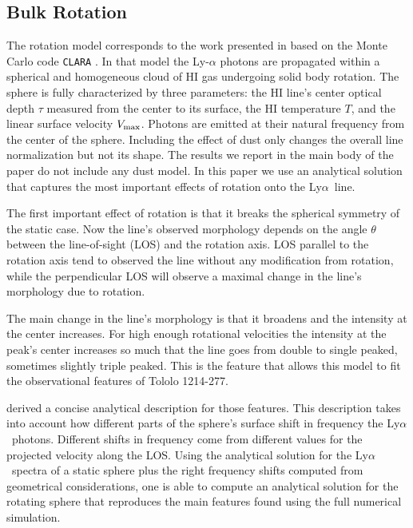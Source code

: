 \documentclass[a4,useAMS,usenatbib,usegraphicx]{mn2e}
\newcommand{\tol}{Tololo 1214-277}
\newcommand{\lya}{Ly$\alpha$}
\begin{document}
\subsection{Bulk Rotation}

The rotation model corresponds to the work presented in
\citep{GaravitoCamargo2014} based on the Monte Carlo code
\texttt{CLARA} \citep{CLARA}. 
In that model the Ly-$\alpha$ photons are propagated 
within a spherical and homogeneous cloud of HI gas undergoing solid
body rotation.
The sphere is fully characterized by three parameters: the HI line's
center optical  depth $\tau$ measured from the center to its surface, the HI
temperature $T$, and the linear surface velocity $V_{\rm max}$.  
Photons are emitted at their natural frequency from the center of the
sphere. 
Including the effect of dust only changes the overall line
normalization but not its shape.  
The results we report in the main body of the paper do not include any
dust model.
In this paper we use an analytical solution that captures the most
important effects of rotation onto the \lya\ line.



The first important effect of rotation is that it breaks the spherical
symmetry of the static case. 
Now the line's observed morphology depends on the angle $\theta$ between the
line-of-sight (LOS) and the rotation axis. 
LOS parallel to the rotation axis tend to observed the line without
any modification from rotation, while the perpendicular LOS will
observe a maximal change in the line's morphology due to rotation.

The main change in the line's morphology is that it broadens and the
intensity at the center increases. 
For high enough rotational velocities the intensity at the peak's
center increases so much that the line goes from double to single
peaked, sometimes slightly triple peaked.
This is the feature that allows this model to fit the observational
features of \tol.

\citep{GaravitoCamargo2014} derived a concise analytical description for
those features. 
This description takes into account how different parts of the
sphere's surface shift in frequency the \lya\ photons. 
Different shifts in frequency come from different values for the projected
velocity along the LOS. 
Using the analytical solution for the \lya\ spectra of a static sphere
plus the right frequency shifts  computed from geometrical
considerations, one is able to compute an analytical solution for the
rotating sphere that reproduces the main features found using the full
numerical simulation. 
\end{document}
